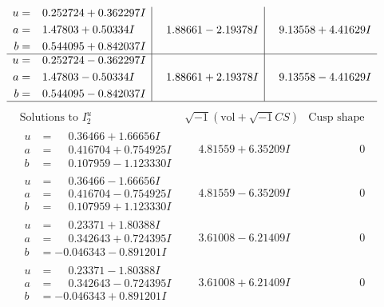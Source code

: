 \documentclass[1p]{elsarticle_modified}
\theoremstyle{definition}
\newcommand{\I}{\sqrt{-1}}
\begin{document}
$$\begin{array}{c|c|c}
\begin{aligned}
u &= \phantom{-}0.252724 + 0.362297 I \\
a &= \phantom{-}1.47803 + 0.50334 I \\
b &= \phantom{-}0.544095 + 0.842037 I\end{aligned}
 & \phantom{-}1.88661 - 2.19378 I & \phantom{-}9.13558 + 4.41629 I \\ \hline\begin{aligned}
u &= \phantom{-}0.252724 - 0.362297 I \\
a &= \phantom{-}1.47803 - 0.50334 I \\
b &= \phantom{-}0.544095 - 0.842037 I\end{aligned}
 & \phantom{-}1.88661 + 2.19378 I & \phantom{-}9.13558 - 4.41629 I\\
 \hline 
 \end{array}$$\newpage$$\begin{array}{c|c|c}  
\text{Solutions to }I^u_{2}& \I (\text{vol} + \sqrt{-1}CS) & \text{Cusp shape}\\
 \hline 
\begin{aligned}
u &= \phantom{-}0.36466 + 1.66656 I \\
a &= \phantom{-}0.416704 + 0.754925 I \\
b &= \phantom{-}0.107959 - 1.123330 I\end{aligned}
 & \phantom{-}4.81559 + 6.35209 I & \phantom{-0.000000 } 0 \\ \hline\begin{aligned}
u &= \phantom{-}0.36466 - 1.66656 I \\
a &= \phantom{-}0.416704 - 0.754925 I \\
b &= \phantom{-}0.107959 + 1.123330 I\end{aligned}
 & \phantom{-}4.81559 - 6.35209 I & \phantom{-0.000000 } 0 \\ \hline\begin{aligned}
u &= \phantom{-}0.23371 + 1.80388 I \\
a &= \phantom{-}0.342643 + 0.724395 I \\
b &= -0.046343 - 0.891201 I\end{aligned}
 & \phantom{-}3.61008 - 6.21409 I & \phantom{-0.000000 } 0 \\ \hline\begin{aligned}
u &= \phantom{-}0.23371 - 1.80388 I \\
a &= \phantom{-}0.342643 - 0.724395 I \\
b &= -0.046343 + 0.891201 I\end{aligned}
 & \phantom{-}3.61008 + 6.21409 I & \phantom{-0.000000 } 0 \\ \hline\begin{aligned}

\end{aligned}
\end{array}$$
\end{document}
